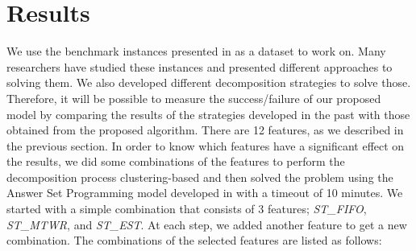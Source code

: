 \documentclass[runningheads]{llncs}
\newcommand{\stest}{\textit{ST\_EST}}
\newcommand{\stmtwr}{\textit{ST\_MTWR}}
\newcommand{\stfifo}{\textit{ST\_FIFO}}
\begin{document}
\section{Results}
\label{sec:eval}
We use the benchmark instances presented in \cite{taillard1993benchmarks} as a dataset to work on. Many researchers have studied these instances and presented different approaches to solving them. We also developed different decomposition strategies to solve those. Therefore, it will be possible to measure the success/failure of our proposed model by comparing the results of the strategies developed in the past with those obtained from the proposed algorithm. There are 12 features, as we described in the previous section. In order to know which features have a significant effect on the results, we did some combinations of the features to perform the decomposition process clustering-based and then solved the problem using the Answer Set Programming model developed in \cite{el2020job} with a timeout of 10 minutes. We started with a simple combination that consists of $3$ features; \stfifo, \stmtwr, and \stest. At each step, we added another feature to get a new combination. The combinations of the selected features are listed as follows:
\end{document}
